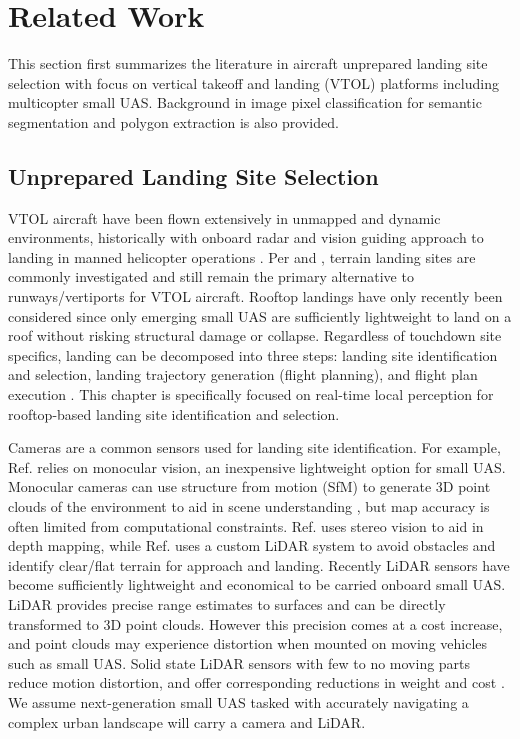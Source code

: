 \section{Related Work}\label{sec:ch6_related_work}

This section first summarizes the literature in aircraft unprepared landing site selection with focus on vertical takeoff and landing (VTOL) platforms including multicopter small UAS.  Background in image pixel classification for semantic segmentation and polygon extraction is also provided. 

\subsection{Unprepared Landing Site Selection}\label{sec:ch6_related_landing}

VTOL aircraft have been flown extensively in unmapped and dynamic environments, historically with onboard radar and vision guiding approach to landing in manned helicopter operations \cite{scherer_autonomous_2012}. Per  \cite{jin_-board_2016} and \cite{desaraju_vision-based_2015}, terrain landing sites are commonly investigated and still remain the primary alternative to runways/vertiports for VTOL aircraft.  Rooftop landings have only recently been considered \cite{desaraju_vision-based_2015, castagno_comprehensive_2018, castagno_map-based_2021} since only emerging small UAS are sufficiently lightweight to land on a roof without risking structural damage or collapse.    Regardless of touchdown site specifics, landing can be decomposed into three steps: landing site identification and selection, landing trajectory generation (flight planning), and flight plan execution \cite{atkins_emergency_2006, dotenco_autonomous_2015}. This chapter is specifically focused on real-time local perception for rooftop-based landing site identification and selection.

Cameras are a common sensors used for landing site identification.  For example, Ref. \cite{jin_-board_2016} relies on monocular vision, an inexpensive lightweight option for small UAS. Monocular cameras can use structure from motion (SfM) to generate 3D point clouds of the environment to aid in scene understanding \cite{schonberger_structure--motion_2016}, but map accuracy is often limited from computational constraints.  Ref. \cite{desaraju_vision-based_2015} uses stereo vision to aid in depth mapping, while Ref. \cite{whalley2009field} uses a custom LiDAR system to avoid obstacles and identify clear/flat terrain for approach and landing.  Recently  LiDAR sensors have become sufficiently lightweight and economical to be carried onboard small UAS.  LiDAR provides precise range estimates to surfaces and can be directly transformed to 3D point clouds.  However this precision comes at a cost increase, and point clouds may experience distortion when mounted on moving vehicles such as small UAS.  Solid state LiDAR sensors with few to no moving parts reduce motion distortion, and offer corresponding reductions in weight and cost \cite{wei_enhancing_2021, nam_solid-state_2021, nxp:tja1043}.  We assume next-generation small UAS tasked with accurately navigating a complex urban landscape will carry a camera and LiDAR. 

